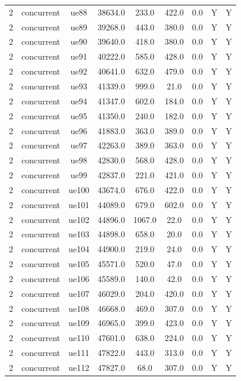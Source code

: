 \begin{table}[ht]
\begin{tabular}{|c|c|c|c|c|c|c|c|c|}
2 & concurrent & ue88 & 38634.0 & 233.0 & 422.0 & 0.0 & Y & Y \\
2 & concurrent & ue89 & 39268.0 & 443.0 & 380.0 & 0.0 & Y & Y \\
2 & concurrent & ue90 & 39640.0 & 418.0 & 380.0 & 0.0 & Y & Y \\
2 & concurrent & ue91 & 40222.0 & 585.0 & 428.0 & 0.0 & Y & Y \\
2 & concurrent & ue92 & 40641.0 & 632.0 & 479.0 & 0.0 & Y & Y \\
2 & concurrent & ue93 & 41339.0 & 999.0 & 21.0 & 0.0 & Y & Y \\
2 & concurrent & ue94 & 41347.0 & 602.0 & 184.0 & 0.0 & Y & Y \\
2 & concurrent & ue95 & 41350.0 & 240.0 & 182.0 & 0.0 & Y & Y \\
2 & concurrent & ue96 & 41883.0 & 363.0 & 389.0 & 0.0 & Y & Y \\
2 & concurrent & ue97 & 42263.0 & 389.0 & 363.0 & 0.0 & Y & Y \\
2 & concurrent & ue98 & 42830.0 & 568.0 & 428.0 & 0.0 & Y & Y \\
2 & concurrent & ue99 & 42837.0 & 221.0 & 421.0 & 0.0 & Y & Y \\
2 & concurrent & ue100 & 43674.0 & 676.0 & 422.0 & 0.0 & Y & Y \\
2 & concurrent & ue101 & 44089.0 & 679.0 & 602.0 & 0.0 & Y & Y \\
2 & concurrent & ue102 & 44896.0 & 1067.0 & 22.0 & 0.0 & Y & Y \\
2 & concurrent & ue103 & 44898.0 & 658.0 & 20.0 & 0.0 & Y & Y \\
2 & concurrent & ue104 & 44900.0 & 219.0 & 24.0 & 0.0 & Y & Y \\
2 & concurrent & ue105 & 45571.0 & 520.0 & 47.0 & 0.0 & Y & Y \\
2 & concurrent & ue106 & 45589.0 & 140.0 & 42.0 & 0.0 & Y & Y \\
2 & concurrent & ue107 & 46029.0 & 204.0 & 420.0 & 0.0 & Y & Y \\
2 & concurrent & ue108 & 46668.0 & 469.0 & 307.0 & 0.0 & Y & Y \\
2 & concurrent & ue109 & 46965.0 & 399.0 & 423.0 & 0.0 & Y & Y \\
2 & concurrent & ue110 & 47601.0 & 638.0 & 224.0 & 0.0 & Y & Y \\
2 & concurrent & ue111 & 47822.0 & 443.0 & 313.0 & 0.0 & Y & Y \\
2 & concurrent & ue112 & 47827.0 & 68.0 & 307.0 & 0.0 & Y & Y \\

\end{tabular}
\end{table}
